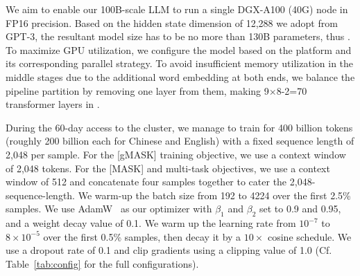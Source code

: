 {
We aim to enable our 100B-scale LLM to run a single DGX-A100 (40G) node in FP16 precision. 
Based on the hidden state dimension of 12,288 we adopt from GPT-3, the resultant model size has to be no more than 130B parameters, thus \glm.
To maximize GPU utilization, we configure the model based on the platform and its corresponding parallel strategy. 
To avoid insufficient memory utilization in the middle stages
due to the additional word embedding at both ends, we balance the pipeline partition by removing one layer from them, making 9$\times$8-2=70 transformer layers in \glm.

During the 60-day access to the cluster, we manage to train \glm for 400 billion tokens (roughly 200 billion each for Chinese and English) with a fixed sequence length of 2,048 per sample. 
For the [gMASK] training objective, we use a context window of 2,048 tokens. 
For the [MASK] and multi-task objectives, we use a context window of 512 and concatenate four samples together to cater the 2,048-sequence-length. 
We warm-up the batch size from 192 to 4224 over the first 2.5\% samples. 
We use AdamW~\citep{loshchilov2017decoupled} as our optimizer with $\beta_1$ and $\beta_2$ set to 0.9 and 0.95, and a weight decay value of 0.1. 
We warm up the learning rate from $10^{-7}$ to $8\times 10^{-5}$ over the first 0.5\% samples, then decay it by a $10\times$ cosine schedule. 
We use a dropout rate of 0.1 and clip gradients using a clipping value of 1.0 (Cf. Table~\ref{tab:config} for the full configurations).

}
